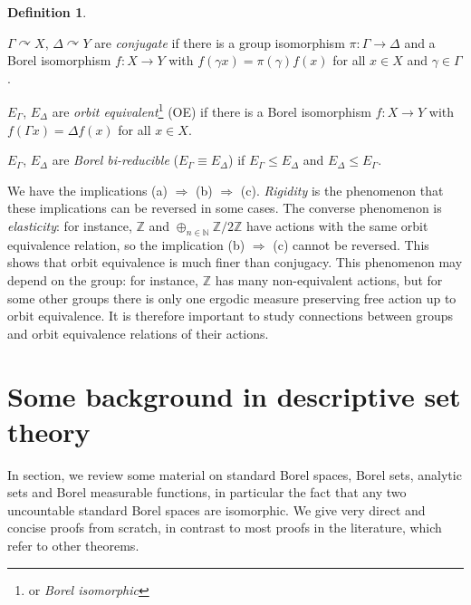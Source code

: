 \documentclass[10pt]{amsart}
\newcommand{\ZZ}{\mathbb{Z}}
\newcommand{\NN}{\mathbb{N}}
\theoremstyle{definition}
\newtheorem*{definition*}{Definition}
\theoremstyle{remark}
\newenvironment{enumerate-(a)}{\begin{enumerate}[label={\upshape (\alph*)}, leftmargin=2pc]}{\end{enumerate}}
\begin{document}
\begin{definition*} 
\begin{enumerate-(a)} 
\item 
$\Gamma\curvearrowright X$, $\Delta\curvearrowright Y$ are \emph{conjugate} if there is a group isomorphism $\pi\colon \Gamma\rightarrow \Delta$ and a Borel isomorphism $f\colon X\rightarrow Y$ with $f(\gamma x)= \pi(\gamma) f(x)$ for all $x\in X$ and $\gamma\in \Gamma$. 
\item 
$E_\Gamma$, $E_\Delta$ are \emph{orbit equivalent}\footnote{or \emph{Borel isomorphic}} (OE) if there is a Borel isomorphism $f\colon X\rightarrow Y$ with $f(\Gamma x)=\Delta f(x)$ for all $x\in X$. 
\item 
$E_\Gamma$, $E_\Delta$ are \emph{Borel bi-reducible} ($E_\Gamma\equiv E_\Delta$) if $E_\Gamma\leq E_\Delta$ and $E_\Delta\leq E_\Gamma$. 
\end{enumerate-(a)} 
\end{definition*} 

We have the implications (a) $\Rightarrow$ (b) $\Rightarrow$ (c). 
\emph{Rigidity} is the phenomenon that these implications can be reversed in some cases. 
The converse phenomenon is \emph{elasticity}: for instance, $\ZZ$ and $\oplus_{n\in\NN} \ZZ/2\ZZ$ have actions with the same orbit equivalence relation, so the implication (b) $\Rightarrow$ (c) cannot be reversed. 
This shows that orbit equivalence is much finer than conjugacy. 
This phenomenon may depend on the group: for instance, $\ZZ$ has many non-equivalent actions, but for some other groups there is only one ergodic measure preserving free action up to orbit equivalence. 
It is therefore important to study connections between groups and orbit equivalence relations of their actions. 






\section{Some background in descriptive set theory} 

In section, we review some material on standard Borel spaces, Borel sets, analytic sets and Borel measurable functions, in particular the fact that any two uncountable standard Borel spaces are isomorphic. 
We give very direct and concise proofs from scratch, in contrast to most proofs in the literature, which refer to other theorems. 
\end{document}
